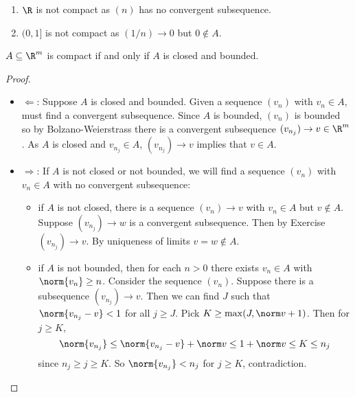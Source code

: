 \documentclass[a4paper]{article}
\theoremstyle{definition}
\begin{document}
\begin{eg}\leavevmode
  \begin{enumerate}
  \item \(\R\) is not compact as \((n)\) has no convergent subsequence.
  \item \((0,1]\) is not compact as \((1/n) \to 0\) but \(0 \notin A\).
  \end{enumerate}
\end{eg}

\begin{theorem}
  \(A \subseteq \R^m\) is compact if and only if \(A\) is closed and bounded.
\end{theorem}

\begin{proof}\leavevmode
  \begin{itemize}
  \item \(\Leftarrow\): Suppose \(A\) is closed and bounded. Given a sequence \((v_n)\) with \(v_n\in A\), must find a convergent subsequence. Since \(A\) is bounded, \((v_n)\) is bounded so by Bolzano-Weierstrass there is a convergent subsequence \((v_{n_j})\to v \in \R^m\). As \(A\) is closed and \(v_{n_j}\in A\), \((v_{n_j})\to v\) implies that \(v \in A\).
  \item \(\Rightarrow\): If \(A\) is not closed or not bounded, we will find a sequence \((v_n)\) with \(v_n \in A\) with no convergent subsequence:
  \begin{itemize}
  \item if \(A\) is not closed, there is a sequence \((v_n)\to v\) with \(v_n \in A\) but \(v \notin A\). Suppose \((v_{n_j}) \to w\) is a convergent subsequence. Then by Exercise \((v_{n_j})\to v\). By uniqueness of limits \(v = w \notin A\).
  \item if \(A\) is not bounded, then for each \(n > 0\) there exists \(v_n \in A\) with \(\norm{v_n} \geq n\). Consider the sequence \((v_n)\). Suppose there is a subsequence \((v_{n_j})\to v\). Then we can find \(J\) such that \(\norm{v_{n_j}-v} < 1\) for all \(j\geq J\). Pick \(K\geq \max(J,\norm v + 1)\). Then for \(j\geq K\),
    \[
      \norm{v_{n_j}} \leq \norm{v_{n_j}-v} + \norm v \leq 1+ \norm v \leq K \leq n_j
    \]
    since \(n_j \geq j \geq K\). So \(\norm{v_{n_j}} < n_j\) for \(j\geq K\), contradiction.
  \end{itemize}
  \end{itemize}
\end{proof}
\end{document}
